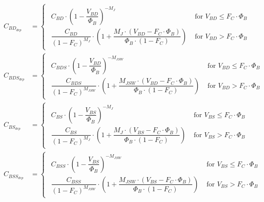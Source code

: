 \begin{align}
C_{BD_{dep}} &= 
\begin{cases}
\begin{array}{ll}
C_{BD}\cdot \left(1 - \dfrac{V_{BD}}{\Phi_{B}}\right)^{-M_{J}} & \textrm{ for } V_{BD} \le F_{C}\cdot \Phi_{B}\\
\dfrac{C_{BD}}{\left(1 - F_{C}\right)^{M_{J}}}\cdot \left(1 + \dfrac{M_{J}\cdot \left(V_{BD} - F_{C}\cdot \Phi_{B}\right)}{\Phi_{B}\cdot \left(1 - F_{C}\right)}\right) & \textrm{ for } V_{BD} > F_{C}\cdot \Phi_{B}
\end{array}
\end{cases}\\
C_{BDS_{dep}} &= 
\begin{cases}
\begin{array}{ll}
C_{BDS}\cdot \left(1 - \dfrac{V_{BD}}{\Phi_{B}}\right)^{-M_{JSW}} & \textrm{ for } V_{BD} \le F_{C}\cdot \Phi_{B}\\
\dfrac{C_{BDS}}{\left(1 - F_{C}\right)^{M_{JSW}}}\cdot \left(1 + \dfrac{M_{JSW}\cdot \left(V_{BD} - F_{C}\cdot \Phi_{B}\right)}{\Phi_{B}\cdot \left(1 - F_{C}\right)}\right) & \textrm{ for } V_{BD} > F_{C}\cdot \Phi_{B}
\end{array}
\end{cases}\\
C_{BS_{dep}} &= 
\begin{cases}
\begin{array}{ll}
C_{BS}\cdot \left(1 - \dfrac{V_{BS}}{\Phi_{B}}\right)^{-M_{J}} & \textrm{ for } V_{BS} \le F_{C}\cdot \Phi_{B}\\
\dfrac{C_{BS}}{\left(1 - F_{C}\right)^{M_{J}}}\cdot \left(1 + \dfrac{M_{J}\cdot \left(V_{BS} - F_{C}\cdot \Phi_{B}\right)}{\Phi_{B}\cdot \left(1 - F_{C}\right)}\right) & \textrm{ for } V_{BS} > F_{C}\cdot \Phi_{B}
\end{array}
\end{cases}\\
C_{BSS_{dep}} &= 
\begin{cases}
\begin{array}{ll}
C_{BSS}\cdot \left(1 - \dfrac{V_{BS}}{\Phi_{B}}\right)^{-M_{JSW}} & \textrm{ for } V_{BS} \le F_{C}\cdot \Phi_{B}\\
\dfrac{C_{BSS}}{\left(1 - F_{C}\right)^{M_{JSW}}}\cdot \left(1 + \dfrac{M_{JSW}\cdot \left(V_{BS} - F_{C}\cdot \Phi_{B}\right)}{\Phi_{B}\cdot \left(1 - F_{C}\right)}\right) & \textrm{ for } V_{BS} > F_{C}\cdot \Phi_{B}
\end{array}
\end{cases}
\end{align}

